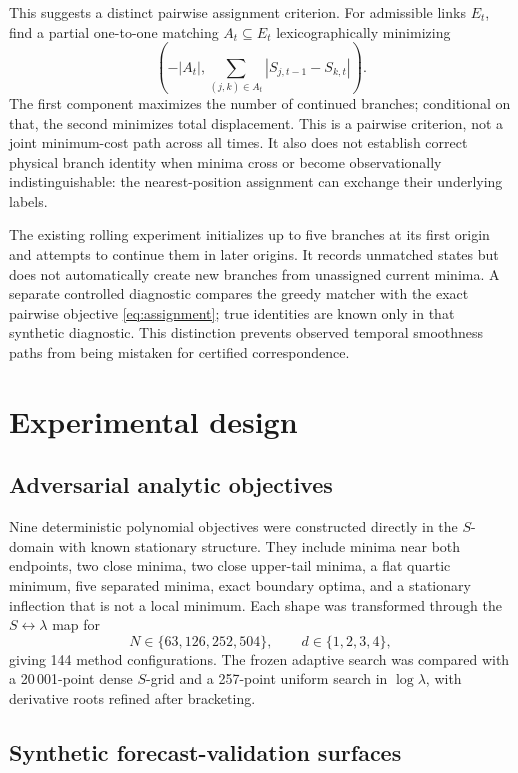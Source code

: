 \documentclass[english]{smcca}
\begin{document}
This suggests a distinct pairwise assignment criterion. For admissible
links $E_t$, find a partial one-to-one matching $A_t\subseteq E_t$
lexicographically minimizing
\begin{equation}
\label{eq:assignment}
\left(
-|A_t|,
\sum_{(j,k)\in A_t}|S_{j,t-1}-S_{k,t}|
\right).
\end{equation}
The first component maximizes the number of continued branches;
conditional on that, the second minimizes total displacement. This
is a pairwise criterion, not a joint minimum-cost path across all times.
It also does not establish correct physical branch identity when minima
cross or become observationally indistinguishable: the nearest-position
assignment can exchange their underlying labels.

The existing rolling experiment initializes up to five branches at its
first origin and attempts to continue them in later origins. It records
unmatched states but does not automatically create new branches from
unassigned current minima. A separate controlled diagnostic compares
the greedy matcher with the exact pairwise objective
\eqref{eq:assignment}; true identities are known only in that synthetic
diagnostic. This distinction prevents observed temporal smoothness
paths from being mistaken for certified correspondence.

\section{Experimental design}

\subsection{Adversarial analytic objectives}

Nine deterministic polynomial objectives were constructed directly in the \(S\)-domain with known stationary structure. They include minima near both endpoints, two close minima, two close upper-tail minima, a flat quartic minimum, five separated minima, exact boundary optima, and a stationary inflection that is not a local minimum. Each shape was transformed through the \(S\leftrightarrow\lambda\) map for
\[
N\in\{63,126,252,504\},
\qquad
d\in\{1,2,3,4\},
\]
giving 144 method configurations. The frozen adaptive search was compared with a 20\,001-point dense \(S\)-grid and a 257-point uniform search in \(\log\lambda\), with derivative roots refined after bracketing.

\subsection{Synthetic forecast-validation surfaces}
\end{document}
